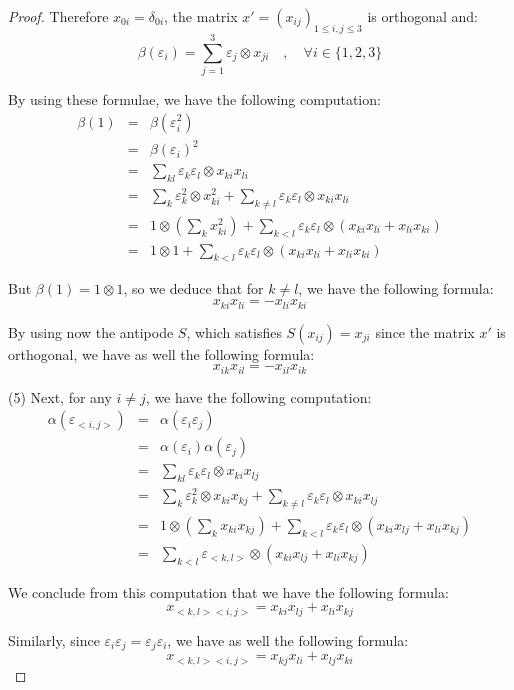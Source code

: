 \documentclass[12pt]{amsbook}
\begin{document}
\begin{proof}
Therefore $x_{0i} = \delta_{0i}$, the matrix $x' =(x_{ij})_{1\leq i,j\leq3}$ is orthogonal and:
$$\beta(\varepsilon_i) = \sum_{j=1}^3 \varepsilon_j \otimes x_{ji}\quad,\quad\forall i\in\{1,2,3\}$$
 
By using these formulae, we have the following computation:
\begin{eqnarray*}
\beta(1)
&=&\beta(\varepsilon_i^2)\\
&=&\beta(\varepsilon_i)^2\\
&=&\sum_{kl}\varepsilon_k\varepsilon_l\otimes x_{ki}x_{li}\\
&=&\sum_k\varepsilon_k^2\otimes x_{ki}^2+\sum_{k\neq l}\varepsilon_k\varepsilon_l\otimes
 x_{ki}x_{li}\\
&=&1\otimes\left(\sum_kx_{ki}^2\right)+\sum_{k<l}\varepsilon_k\varepsilon_l\otimes (x_{ki}x_{li} +x_{li}x_{ki})\\
&=&1\otimes 1+\sum_{k<l}\varepsilon_k\varepsilon_l\otimes(x_{ki}x_{li}+x_{li}x_{ki})
\end{eqnarray*}

But $\beta(1)=1\otimes1$, so we deduce that for $k\neq l$, we have the following formula:
$$x_{ki}x_{li}=-x_{li}x_{ki}$$

By using now the antipode $S$, which satisfies $S(x_{ij})=x_{ji}$ since the matrix $x'$ is orthogonal, we have as well the following formula:
$$x_{ik}x_{il}=-x_{il}x_{ik}$$

(5) Next, for any $i\neq j$, we have the following computation:
\begin{eqnarray*}
\alpha(\varepsilon_{<i,j>})
&=&\alpha(\varepsilon_i \varepsilon_j)\\
&=&\alpha(\varepsilon_i)\alpha(\varepsilon_j)\\
&=&\sum_{kl}\varepsilon_k\varepsilon_l\otimes x_{ki}x_{lj}\\
&=&\sum_k\varepsilon_k^2\otimes x_{ki}x_{kj}+\sum_{k \neq l}\varepsilon_k\varepsilon_l\otimes
 x_{ki}x_{lj}\\
&=&1\otimes\left(\sum_kx_{ki}x_{kj}\right)+\sum_{k<l}\varepsilon_k\varepsilon_l\otimes(x_{ki}x_{lj}+x_{li}x_{kj})\\
&=&\sum_{k<l}\varepsilon_{<k,l>}\otimes(x_{ki}x_{lj}+x_{li}x_{kj})
\end{eqnarray*}

We conclude from this computation that we have the following formula:
$$x_{<k,l><i,j>}=x_{ki}x_{lj}+x_{li}x_{kj}$$

Similarly, since $\varepsilon_i\varepsilon_j=\varepsilon_j\varepsilon_i$, we have as well the following formula:
$$x_{<k,l><i,j>}=x_{kj}x_{li}+x_{lj}x_{ki}$$
 

\end{proof}
\end{document}
